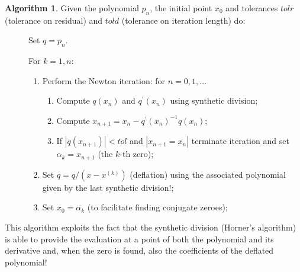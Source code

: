 \documentclass[10pt,a4paper]{article}
\theoremstyle{definition}%
\newtheorem{algo}{Algorithm}
\begin{document}
\begin{algo}
    Given the polynomial $p_n$, the initial point $x_0$ and tolerances $tolr$ (tolerance on residual) and $told$
    (tolerance on iteration length)
    do:
    \begin{description}
        \item[] Set $q=p_n$.
        \item[] For $k=1,n$:
        \begin{enumerate}
            \item Perform the Newton iteration: for $n=0,1,\ldots$
            \begin{enumerate}
                \item Compute $q(x_n)$ and $q^\prime(x_n)$ using synthetic division;
                \item Compute $x_{n+1}=x_{n}-q^\prime(x_{n})^{-1}q(x_n)$;
                \item If $|q(x_{n+1})|<tol$ and $|x_{n+1}=x_{n}|$ terminate iteration and set
            $\alpha_k=x_{n+1}$ (the $k$-th zero);
            \end{enumerate}
            \item Set $q=q/(x-x^{(k)})$ (deflation) using the associated polynomial given by the last synthetic division!;
            \item Set $x_0=\overline{\alpha_k}$ (to facilitate finding conjugate zeroes);
        \end{enumerate}
    \end{description}
\end{algo}

This algorithm  exploits the fact that the synthetic division (Horner's algorithm) is able to provide the evaluation at a point of both the polynomial and its derivative and, when the zero is found, also the coefficients of the deflated polynomial! 
\end{document}

